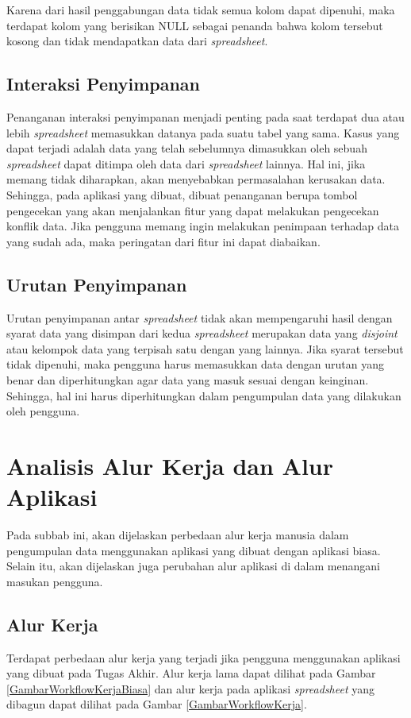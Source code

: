 	Karena dari hasil penggabungan data tidak semua kolom dapat dipenuhi, maka terdapat kolom yang berisikan NULL sebagai penanda bahwa kolom tersebut kosong dan tidak mendapatkan data dari \textit{spreadsheet}.

\subsection{Interaksi Penyimpanan}
Penanganan interaksi penyimpanan menjadi penting pada saat terdapat dua atau lebih \textit{spreadsheet} memasukkan datanya pada suatu tabel yang sama. Kasus yang dapat terjadi adalah data yang telah sebelumnya dimasukkan oleh sebuah \textit{spreadsheet} dapat ditimpa oleh data dari \textit{spreadsheet} lainnya. Hal ini, jika memang tidak diharapkan, akan menyebabkan permasalahan kerusakan data. Sehingga, pada aplikasi yang dibuat, dibuat penanganan berupa tombol pengecekan yang akan menjalankan fitur yang dapat melakukan pengecekan konflik data. Jika pengguna memang ingin melakukan penimpaan terhadap data yang sudah ada, maka peringatan dari fitur ini dapat diabaikan.

\subsection{Urutan Penyimpanan}
Urutan penyimpanan antar \textit{spreadsheet} tidak akan mempengaruhi hasil dengan syarat data yang disimpan dari kedua \textit{spreadsheet} merupakan data yang \textit{disjoint} atau kelompok data yang terpisah satu dengan yang lainnya. Jika syarat tersebut tidak dipenuhi, maka pengguna harus memasukkan data dengan urutan yang benar dan diperhitungkan agar data yang masuk sesuai dengan keinginan. Sehingga, hal ini harus diperhitungkan dalam pengumpulan data yang dilakukan oleh pengguna.

\section{Analisis Alur Kerja dan Alur Aplikasi} \label{Aluralur}
Pada subbab ini, akan dijelaskan perbedaan alur kerja manusia dalam pengumpulan data menggunakan aplikasi yang dibuat dengan aplikasi biasa. Selain itu, akan dijelaskan juga perubahan alur aplikasi di dalam menangani masukan pengguna.

\subsection{Alur Kerja}
Terdapat perbedaan alur kerja yang terjadi jika pengguna menggunakan aplikasi yang dibuat pada Tugas Akhir. Alur kerja lama dapat dilihat pada Gambar \ref{GambarWorkflowKerjaBiasa} dan alur kerja pada aplikasi \textit{spreadsheet} yang dibagun dapat dilihat pada Gambar \ref{GambarWorkflowKerja}.

